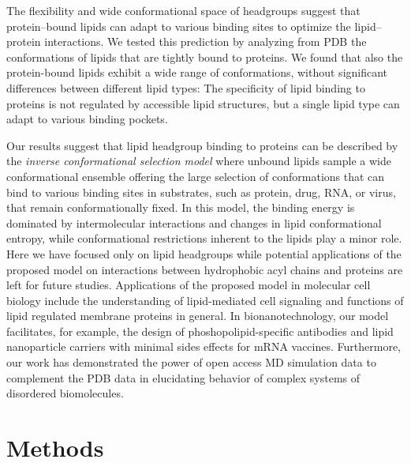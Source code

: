 \documentclass[journal=jpcbfk,manuscript=article]{achemso}
\begin{document}
The flexibility and wide conformational space of headgroups suggest that protein--bound lipids can
adapt to various binding sites to optimize the lipid--protein interactions.
We tested this prediction by analyzing from PDB the conformations of lipids that are tightly bound to proteins.
We found that also the protein-bound lipids exhibit a wide range of conformations, without significant 
differences between different lipid types: The specificity of lipid binding to proteins is not
regulated by accessible lipid structures, but a single lipid type can adapt to various binding pockets.

Our results suggest that lipid headgroup binding to proteins can be described by the {\it inverse conformational selection model}
where unbound lipids sample a wide conformational ensemble offering the large selection of conformations
that can bind to various binding sites in substrates, such as protein, drug, RNA, or virus, that remain conformationally fixed.
In this model, the binding energy is dominated by
intermolecular interactions and changes in lipid conformational entropy, while 
conformational restrictions inherent to the lipids play a minor role.
Here we have focused only on lipid headgroups while potential applications of the proposed model on interactions between hydrophobic acyl chains and proteins are left for future studies. 
Applications of the proposed model in molecular cell biology include the understanding of lipid-mediated cell signaling
and functions of lipid regulated membrane proteins in general. 
In bionanotechnology, our model facilitates, for example,
the design of phoshopolipid-specific antibodies and lipid nanoparticle carriers with minimal sides effects for mRNA vaccines.
Furthermore, our work has demonstrated the power of open access MD simulation data
to complement the PDB data in elucidating behavior of complex systems of disordered biomolecules.

\section{Methods}
\end{document}

